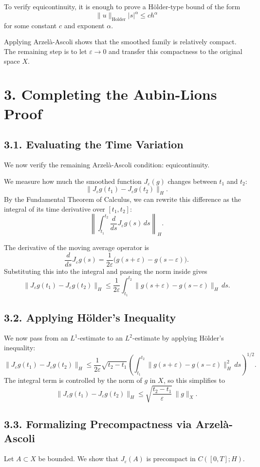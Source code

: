 \documentclass[11pt]{article}
\theoremstyle{definition}
\theoremstyle{remark}
\begin{document}
To verify equicontinuity, it is enough to prove a Hölder-type bound of the form
\[
\|u\|_{\text{Holder}}|s|^\alpha\le ch^\alpha
\]
for some constant \(c\) and exponent \(\alpha\).

Applying Arzelà-Ascoli shows that the smoothed family is relatively compact. The remaining step is to let \(\varepsilon\to 0\) and transfer this compactness to the original space \(X\).

\section*{3. Completing the Aubin-Lions Proof}

\subsection*{3.1. Evaluating the Time Variation}
We now verify the remaining Arzelà-Ascoli condition: equicontinuity.

We measure how much the smoothed function \(J_\varepsilon(g)\) changes between \(t_1\) and \(t_2\):
\[
\|J_\varepsilon g(t_1)-J_\varepsilon g(t_2)\|_H.
\]
By the Fundamental Theorem of Calculus, we can rewrite this difference as the integral of its time derivative over \([t_1,t_2]\):
\[
\left\|
\int_{t_1}^{t_2}\frac{d}{ds}J_\varepsilon g(s)\,ds
\right\|_H.
\]

The derivative of the moving average operator is
\[
\frac{d}{ds}J_\varepsilon g(s)
=
\frac{1}{2\varepsilon}\bigl(g(s+\varepsilon)-g(s-\varepsilon)\bigr).
\]
Substituting this into the integral and passing the norm inside gives
\[
\|J_\varepsilon g(t_1)-J_\varepsilon g(t_2)\|_H
\le
\frac{1}{2\varepsilon}\int_{t_1}^{t_2}\|g(s+\varepsilon)-g(s-\varepsilon)\|_H\,ds.
\]

\subsection*{3.2. Applying Hölder's Inequality}
We now pass from an \(L^1\)-estimate to an \(L^2\)-estimate by applying Hölder's inequality:
\[
\|J_\varepsilon g(t_1)-J_\varepsilon g(t_2)\|_H
\le
\frac{1}{2\varepsilon}
\sqrt{t_2-t_1}
\left(
\int_{t_1}^{t_2}\|g(s+\varepsilon)-g(s-\varepsilon)\|_H^2\,ds
\right)^{1/2}.
\]
The integral term is controlled by the norm of \(g\) in \(X\), so this simplifies to
\[
\|J_\varepsilon g(t_1)-J_\varepsilon g(t_2)\|_H
\le
\sqrt{\frac{t_2-t_1}{\varepsilon}}\,
\|g\|_X.
\]

\subsection*{3.3. Formalizing Precompactness via Arzelà-Ascoli}
Let \(A\subset X\) be bounded. We show that \(J_\varepsilon(A)\) is precompact in \(C([0,T];H)\).
\end{document}

